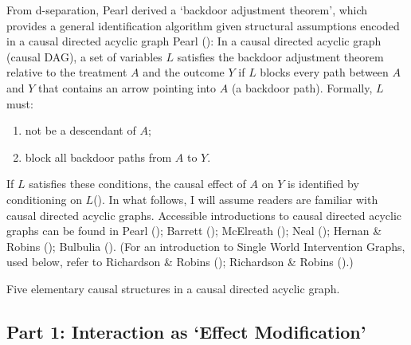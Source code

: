 \documentclass[
  single column]{article}
\providecommand{\tightlist}{%
  \setlength{\itemsep}{0pt}\setlength{\parskip}{0pt}}\usepackage{longtable,booktabs,array}
\begin{document}
From d-separation, Pearl derived a `backdoor adjustment theorem', which
provides a general identification algorithm given structural assumptions
encoded in a causal directed acyclic graph Pearl
(): In a causal directed acyclic graph
(causal DAG), a set of variables \(L\) satisfies the backdoor adjustment
theorem relative to the treatment \(A\) and the outcome \(Y\) if \(L\)
blocks every path between \(A\) and \(Y\) that contains an arrow
pointing into \(A\) (a backdoor path). Formally, \(L\) must:

\begin{enumerate}
\def\labelenumi{\arabic{enumi}.}
\tightlist
\item
  not be a descendant of \(A\);
\item
  block all backdoor paths from \(A\) to \(Y\).
\end{enumerate}

If \(L\) satisfies these conditions, the causal effect of \(A\) on \(Y\)
is identified by conditioning on
\(\boxed{L}\)(). In what follows,
I will assume readers are familiar with causal directed acyclic graphs.
Accessible introductions to causal directed acyclic graphs can be found
in Pearl (); Barrett
(); McElreath
(); Neal
(); Hernan \& Robins
(); Bulbulia
(). (For an introduction to Single
World Intervention Graphs, used below, refer to Richardson \& Robins
(); Richardson \& Robins
().)

\begin{table}

\caption{\label{tbl-terminologydirectedgraph}Five elementary causal
structures in a causal directed acyclic graph.}

\centering{

\terminologydirectedgraph

}

\end{table}%

\newpage{}

\subsection{Part 1: Interaction as `Effect
Modification'}\label{id-sec-1}
\end{document}

